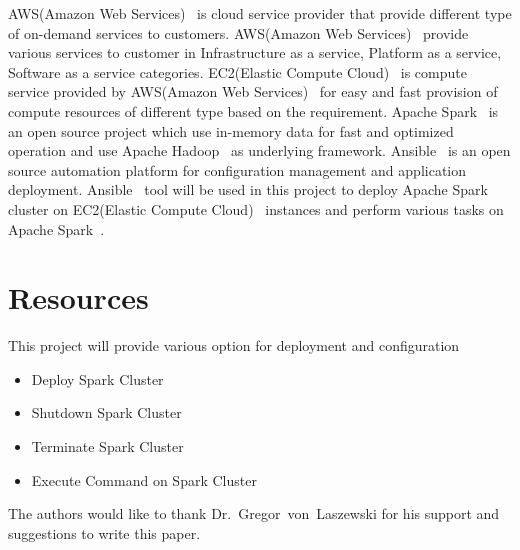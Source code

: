 AWS(Amazon Web Services)~\cite{hid-sp18-511-www-aws} is cloud service
provider that provide different type of on-demand services to
customers. AWS(Amazon Web Services)~\cite{hid-sp18-511-www-aws} provide
various services to customer in Infrastructure as a service, Platform as a
service, Software as a service categories. EC2(Elastic Compute
Cloud)~\cite{hid-sp18-511-www-ec2} is compute service provided by
AWS(Amazon Web Services)~\cite{hid-sp18-511-www-aws} for easy and fast
provision of compute resources of different type based on the
requirement. Apache Spark~\cite{hid-sp18-511-www-spark} is an open source
project which use in-memory data for fast and optimized operation and
use Apache Hadoop~\cite{hid-sp18-511-www-hadoop} as underlying
framework. Ansible~\cite{hid-sp18-511-www-ansible} is an open source automation platform
for configuration management and application
deployment. Ansible~\cite{hid-sp18-511-www-ansible} tool will be used
in this project to deploy Apache Spark~\cite{hid-sp18-511-www-spark}
cluster on EC2(Elastic Compute Cloud)~\cite{hid-sp18-511-www-ec2}
instances and perform various tasks on Apache
Spark~\cite{hid-sp18-511-www-spark}.

\section{Resources}
This project will provide various option for deployment and
configuration

\begin{itemize}
	\item Deploy Spark Cluster
        \item Shutdown Spark Cluster
        \item Terminate Spark Cluster
        \item Execute Command on Spark Cluster
\end{itemize}

\begin{acks}

  The authors would like to thank Dr.~Gregor~von~Laszewski for his
  support and suggestions to write this paper.

\end{acks}


 

